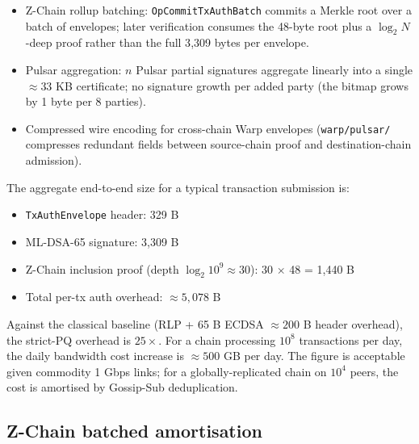 \begin{itemize}[leftmargin=2em,nosep]
  \item Z-Chain rollup batching: \texttt{OpCommitTxAuthBatch} commits a
    Merkle root over a batch of envelopes; later verification consumes the
    48-byte root plus a $\log_2 N$-deep proof rather than the full 3{,}309
    bytes per envelope.
  \item Pulsar aggregation: $n$ Pulsar partial signatures aggregate
    linearly into a single $\approx 33$ KB certificate; no signature
    growth per added party (the bitmap grows by 1 byte per 8 parties).
  \item Compressed wire encoding for cross-chain Warp envelopes
    (\texttt{warp/pulsar/} compresses redundant fields between source-chain
    proof and destination-chain admission).
\end{itemize}

The aggregate end-to-end size for a typical transaction submission is:

\begin{itemize}[leftmargin=2em,nosep]
  \item \texttt{TxAuthEnvelope} header: 329 B
  \item ML-DSA-65 signature: 3{,}309 B
  \item Z-Chain inclusion proof (depth $\log_2 10^9 \approx 30$): 30 $\times$
    48 = 1{,}440 B
  \item Total per-tx auth overhead: $\approx 5{,}078$ B
\end{itemize}

Against the classical baseline (RLP + 65 B ECDSA $\approx 200$ B header
overhead), the strict-PQ overhead is $25\times$. For a chain processing
$10^8$ transactions per day, the daily bandwidth cost increase is
$\approx 500$ GB per day. The figure is acceptable given commodity 1 Gbps
links; for a globally-replicated chain on $10^4$ peers, the cost is
amortised by Gossip-Sub deduplication.

\subsection{Z-Chain batched amortisation}

